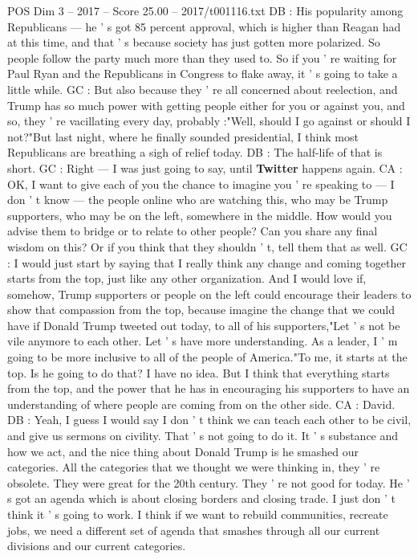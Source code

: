 \begin{textsample}{POS Dim 3 – 2017 – Score 25.00 – 2017/t001116.txt}
DB : His popularity among Republicans — he ' s got 85 percent approval, which is higher than Reagan had at this time, and that ' s because society has just gotten more polarized.
So people follow the party much more than they used to.
So if you ' re waiting for Paul Ryan and the Republicans in Congress to flake away, it ' s going to take a little while.
GC : But also because they ' re all concerned about reelection, and Trump has so much power with getting people either for you or against you, and so, they ' re vacillating every day, probably :"Well, should I go against or should I not?"But last night, where he finally sounded presidential, I think most Republicans are breathing a sigh of relief today.
DB : The half-life of that is short.
GC : Right — I was just going to say, until \textbf{Twitter} happens again.
CA : OK, I want to give each of you the chance to imagine you ' re speaking to — I don ' t know — the people online who are watching this, who may be Trump supporters, who may be on the left, somewhere in the middle.
How would you advise them to bridge or to relate to other people?
Can you share any final wisdom on this?
Or if you think that they shouldn ' t, tell them that as well.
GC : I would just start by saying that I really think any change and coming together starts from the top, just like any other organization.
And I would love if, somehow, Trump supporters or people on the left could encourage their leaders to show that compassion from the top, because imagine the change that we could have if Donald Trump tweeted out today, to all of his supporters,"Let ' s not be vile anymore to each other.
Let ' s have more understanding.
As a leader, I ' m going to be more inclusive to all of the people of America."To me, it starts at the top.
Is he going to do that?
I have no idea.
But I think that everything starts from the top, and the power that he has in encouraging his supporters to have an understanding of where people are coming from on the other side.
CA : David.
DB : Yeah, I guess I would say I don ' t think we can teach each other to be civil, and give us sermons on civility.
That ' s not going to do it.
It ' s substance and how we act, and the nice thing about Donald Trump is he smashed our categories.
All the categories that we thought we were thinking in, they ' re obsolete.
They were great for the 20th century.
They ' re not good for today.
He ' s got an agenda which is about closing borders and closing trade.
I just don ' t think it ' s going to work.
I think if we want to rebuild communities, recreate jobs, we need a different set of agenda that smashes through all our current divisions and our current categories.

\end{textsample}
